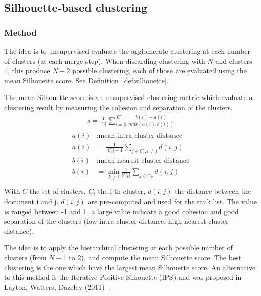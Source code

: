 \subsection{Silhouette-based clustering \label{sec:silhouette-based_clustering}}

\subsubsection{Method}

The idea is to unsupervised evaluate the agglomerate clustering at each number of clusters (at each merge step).
When discarding clustering with $N$ and clusters $1$, this produce $N - 2$ possible clustering, each of those are evaluated using the mean Silhouette score.
See Definition~\ref{def:silhouette}.

\begin{definition}
  \label{def:silhouette}
  The mean Silhouette score is an unsupervised clustering metric which evaluate a clustering result by measuring the cohesion and separation of the clusters.
  \begin{gather*}
    s = \frac{1}{|C|} \sum_{i = 0}^{|C|} \frac{b(i) - a(i)}{max(a(i), b(i))}
  \end{gather*}
  \begin{gather*}
    \begin{split}
      a(i)&: \text{mean intra-cluster distance} \\
      a(i)& = \frac{1}{|C_i| - 1} \sum_{j \in C_i, i\neq j} d(i, j) \\
      b(i)&: \text{mean nearest-cluster distance} \\
      b(i)& = \min_{k\neq i} \frac{1}{|C_k|} \sum_{j \in C_k} d(i, j) \\
    \end{split}
  \end{gather*}
  With $C$ the set of clusters, $C_i$ the i-th cluster, $d(i, j)$ the distance between the document i and j.
  $d(i, j)$ are pre-computed and used for the rank list.
  The value is ranged between -1 and 1, a large value indicate a good cohesion and good separation of the clusters (low intra-cluster distance, high nearest-cluster distance).
\end{definition}

The idea is to apply the hierarchical clustering at each possible number of clusters (from $N - 1$ to $2$), and compute the mean Silhouette score.
The best clustering is the one which have the largest mean Silhouette score.
An alternative to this method is the Iterative Positive Silhouette (IPS) and was proposed in Layton, Watters, Dazeley (2011)~\cite{automated_unsupervised}.

